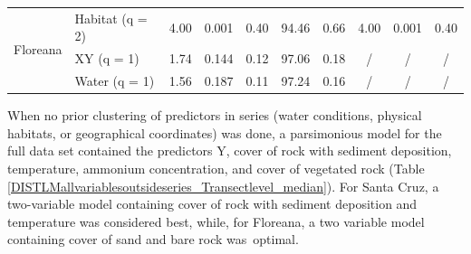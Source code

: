 \documentclass[jmse,article,accept,moreauthors,pdftex]{Definitions/mdpi}
\begin{document}
\begin{specialtable}[H]
{\begin{tabular}{llcccccccc}
\midrule
\multirow{3}{*}{Floreana}                                                & Habitat (q = 2)                 & 4.00     & 0.001 & 0.40     & 94.46 & 0.66 & 4.00     & 0.001 & 0.40                \\ 
& XY (q = 1)                      & 1.74     & 0.144 & 0.12     & 97.06 & 0.18     & /        & /     & /                   \\
                                                                         & Water (q = 1)                   & 1.56     & 0.187 & 0.11     & 97.24 & 0.16     & /        & /     & /                   \\ 
                                                                         
\bottomrule
\end{tabular}
}
\end{specialtable}
\begin{paracol}{2}
\switchcolumn

\renewcommand{\arraystretch}{1}


When no prior clustering of predictors in series (water conditions, physical habitats, or geographical coordinates) was done, a parsimonious model for the full data set contained the predictors Y, cover of rock with sediment deposition, temperature, ammonium concentration, and cover of vegetated rock (Table \ref{DISTLMallvariablesoutsideseries_Transectlevel_median}). For Santa Cruz, a two-variable model containing cover of rock with sediment deposition and temperature was considered best, while, for Floreana, a two variable model containing cover of sand and bare rock was~optimal.



%
\renewcommand{\arraystretch}{1.25}
\end{paracol}
\nointerlineskip
\end{document}
